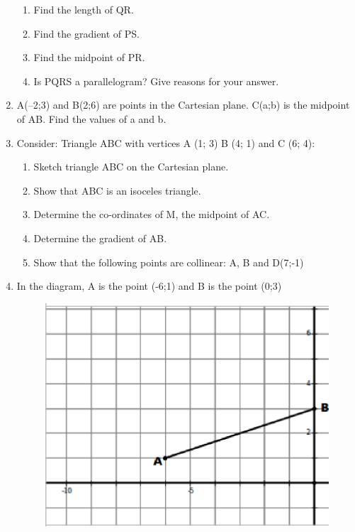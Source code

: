 \begin{enumerate}[noitemsep, label=\textbf{\arabic*}. ]
\begin{enumerate}[noitemsep, label=\textbf{\alph*}. ] 
\item Find the length of QR.\item Find the gradient of PS.\item Find the midpoint of PR.\item Is PQRS a parallelogram?  Give reasons for your answer. \end{enumerate}
  \item A(--2;3) and B(2;6) are points in the Cartesian plane.  C(a;b) is the midpoint of AB. Find the values of a and b.\newline
\item 
Consider: Triangle ABC with vertices A (1; 3) B (4; 1) and C (6; 4):
\begin{enumerate}[noitemsep, label=\textbf{\alph*}. ] 
\item Sketch triangle ABC on the Cartesian plane. \item Show that ABC is an isoceles triangle.\item Determine the co-ordinates of M, the midpoint of AC.\item Determine the gradient of AB.\item Show that the following points are collinear: A, B and D(7;-1)\end{enumerate}
\item In the diagram, A is the point (-6;1) and B is the point (0;3)
\setcounter{subfigure}{0}
\begin{figure}[H] %
\begin{center}
\label{m39358*id740344!!!underscore!!!media}\label{m39358*id740344!!!underscore!!!printimage}\includegraphics[width=.7\columnwidth]{col11306.imgs/m39358_MG10C14_5.png} %
\vspace{2pt}

\end{center}
\end{figure}
\end{enumerate}
